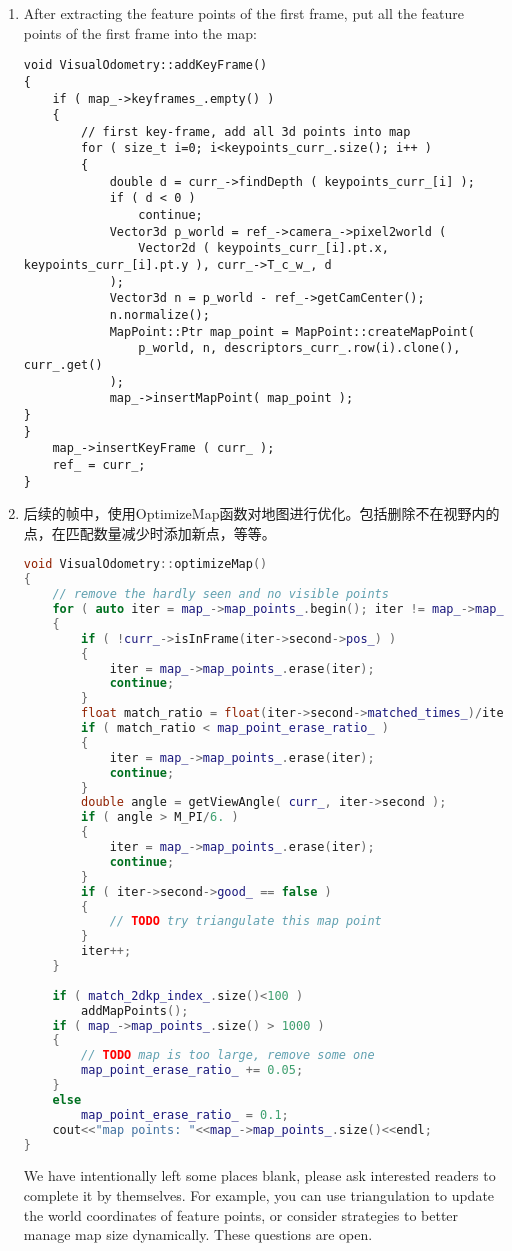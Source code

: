 \begin{enumerate}
\item After extracting the feature points of the first frame, put all the feature points of the first frame into the map:
\begin{lstlisting}[language = c ++]
void VisualOdometry::addKeyFrame()
{
	if ( map_->keyframes_.empty() )
	{
		// first key-frame, add all 3d points into map
		for ( size_t i=0; i<keypoints_curr_.size(); i++ )
		{
			double d = curr_->findDepth ( keypoints_curr_[i] );
			if ( d < 0 ) 
				continue;
			Vector3d p_world = ref_->camera_->pixel2world (
				Vector2d ( keypoints_curr_[i].pt.x, keypoints_curr_[i].pt.y ), curr_->T_c_w_, d
			);
			Vector3d n = p_world - ref_->getCamCenter();
			n.normalize();
			MapPoint::Ptr map_point = MapPoint::createMapPoint(
				p_world, n, descriptors_curr_.row(i).clone(), curr_.get()
			);
			map_->insertMapPoint( map_point );
}
}
	map_->insertKeyFrame ( curr_ );
	ref_ = curr_;
}
\end{lstlisting}
	\item 后续的帧中，使用OptimizeMap函数对地图进行优化。包括删除不在视野内的点，在匹配数量减少时添加新点，等等。
\begin{lstlisting}[language=c++]
void VisualOdometry::optimizeMap()
{
	// remove the hardly seen and no visible points 
	for ( auto iter = map_->map_points_.begin(); iter != map_->map_points_.end(); )
	{
		if ( !curr_->isInFrame(iter->second->pos_) )
		{
			iter = map_->map_points_.erase(iter);
			continue;
		}
		float match_ratio = float(iter->second->matched_times_)/iter->second->visible_times_;
		if ( match_ratio < map_point_erase_ratio_ )
		{
			iter = map_->map_points_.erase(iter);
			continue;
		}
		double angle = getViewAngle( curr_, iter->second );
		if ( angle > M_PI/6. )
		{
			iter = map_->map_points_.erase(iter);
			continue;
		}
		if ( iter->second->good_ == false )
		{
			// TODO try triangulate this map point 
		}
		iter++;
	}
	
	if ( match_2dkp_index_.size()<100 )
		addMapPoints();
	if ( map_->map_points_.size() > 1000 )  
	{
		// TODO map is too large, remove some one 
		map_point_erase_ratio_ += 0.05;
	}
	else 
		map_point_erase_ratio_ = 0.1;
	cout<<"map points: "<<map_->map_points_.size()<<endl;
}
\end{lstlisting}
We have intentionally left some places blank, please ask interested readers to complete it by themselves. For example, you can use triangulation to update the world coordinates of feature points, or consider strategies to better manage map size dynamically. These questions are open.


\end{enumerate}
